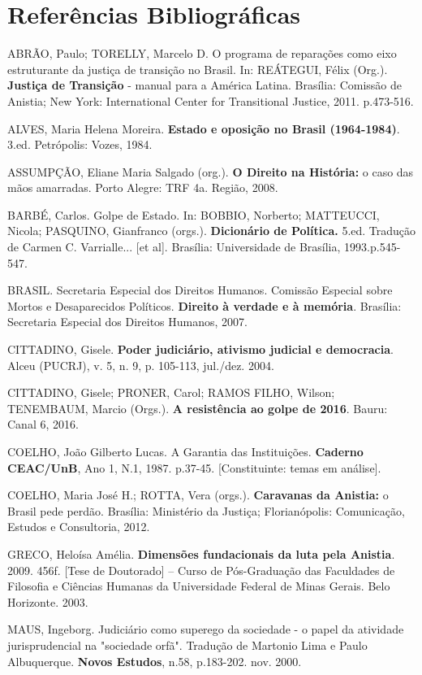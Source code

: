 \section{Referências Bibliográficas}

ABRÃO, Paulo; TORELLY, Marcelo D. O programa de reparações como eixo
estruturante da justiça de transição no Brasil. In: REÁTEGUI, Félix
(Org.). \textbf{Justiça de Transição} - manual para a América Latina.
Brasília: Comissão de Anistia; New York: International Center for
Transitional Justice, 2011. p.473-516.

ALVES, Maria Helena Moreira. \textbf{Estado e oposição no Brasil
(1964-1984)}. 3.ed. Petrópolis: Vozes, 1984.

ASSUMPÇÃO, Eliane Maria Salgado (org.). \textbf{O Direito na História:}
o caso das mãos amarradas. Porto Alegre: TRF 4a. Região, 2008.

BARBÉ, Carlos. Golpe de Estado. In: BOBBIO, Norberto; MATTEUCCI, Nicola;
PASQUINO, Gianfranco (orgs.). \textbf{Dicionário de Política.} 5.ed.
Tradução de Carmen C. Varrialle... {[}et al{]}. Brasília: Universidade
de Brasília, 1993.p.545-547.

BRASIL. Secretaria Especial dos Direitos Humanos. Comissão Especial
sobre Mortos e Desaparecidos Políticos. \textbf{Direito à verdade e à
memória}. Brasília: Secretaria Especial dos Direitos Humanos, 2007.

CITTADINO, Gisele. \textbf{Poder judiciário, ativismo judicial e
democracia}. Alceu (PUCRJ), v. 5, n. 9, p. 105-113, jul./dez. 2004.

CITTADINO, Gisele; PRONER, Carol; RAMOS FILHO, Wilson; TENEMBAUM, Marcio
(Orgs.). \textbf{A resistência ao golpe de 2016}. Bauru: Canal 6, 2016.

COELHO, João Gilberto Lucas. A Garantia das Instituições.
\textbf{Caderno CEAC/UnB}, Ano 1, N.1, 1987. p.37-45. {[}Constituinte:
temas em análise{]}.

COELHO, Maria José H.; ROTTA, Vera (orgs.). \textbf{Caravanas da
Anistia:} o Brasil pede perdão. Brasília: Ministério da Justiça;
Florianópolis: Comunicação, Estudos e Consultoria, 2012.

GRECO, Heloísa Amélia. \textbf{Dimensões fundacionais da luta pela
Anistia}. 2009. 456f. {[}Tese de Doutorado{]} -- Curso de Pós-Graduação
das Faculdades de Filosofia e Ciências Humanas da Universidade Federal
de Minas Gerais. Belo Horizonte. 2003.

MAUS, Ingeborg. Judiciário como superego da sociedade - o papel da
atividade jurisprudencial na "sociedade orfã". Tradução de Martonio Lima
e Paulo Albuquerque. \textbf{Novos Estudos}, n.58, p.183-202. nov. 2000.

